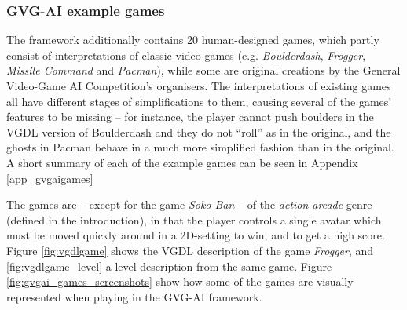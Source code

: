 \documentclass[a4paper,titlepage,final]{report}
\begin{document}
\subsubsection*{GVG-AI example games}
The framework additionally contains 20 human-designed games, which partly consist of interpretations of classic video games (e.g. \textit{Boulderdash}, \textit{Frogger}, \textit{Missile Command} and \textit{Pacman}), while some are original creations by the General Video-Game AI Competition's organisers. 
The interpretations of existing games all have different stages of simplifications to them, causing several of the games' features to be missing -- for instance, the player cannot push boulders in the VGDL version of Boulderdash and they do not ``roll'' as in the original, and the ghosts in Pacman behave in a much more simplified fashion than in the original.
A short summary of each of the example games can be seen in Appendix \ref{app_gvgaigames}

The games are -- except for the game \emph{Soko-Ban} -- of the \textit{action-arcade} genre (defined in the introduction), in that the player controls a single avatar which must be moved quickly around in a 2D-setting to win, and to get a high score.
Figure \ref{fig:vgdlgame} shows the VGDL description of the game \emph{Frogger}, and \ref{fig:vgdlgame_level} a level description from the same game.
Figure \ref{fig:gvgai_games_screenshots} show how some of the games are visually represented when playing in the GVG-AI framework.
\end{document}
